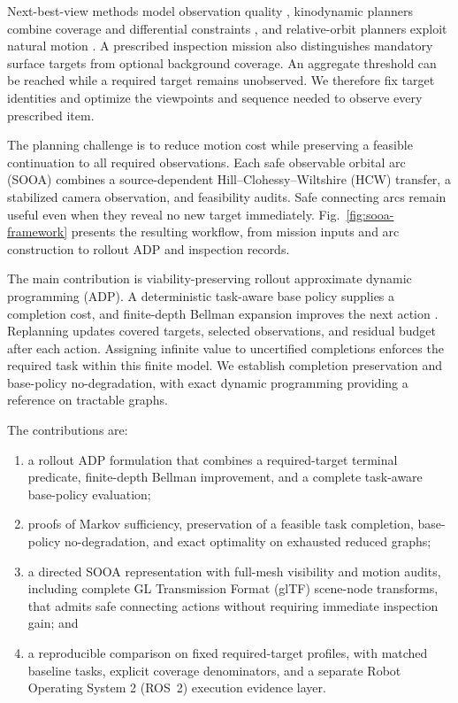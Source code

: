 \documentclass{IEEEtaes}
\theoremstyle{remark}
\theoremstyle{plain}
\begin{document}
Next-best-view methods model observation quality \cite{scott2003view}, kinodynamic planners combine coverage and differential constraints \cite{faghihi2022kinodynamic,faghihi2023multiple}, and relative-orbit planners exploit natural motion \cite{hou2024relative,deka2023astrodynamics}. A prescribed inspection mission also distinguishes mandatory surface targets from optional background coverage. An aggregate threshold can be reached while a required target remains unobserved. We therefore fix target identities and optimize the viewpoints and sequence needed to observe every prescribed item.

The planning challenge is to reduce motion cost while preserving a feasible continuation to all required observations. Each safe observable orbital arc (SOOA) combines a source-dependent Hill--Clohessy--Wiltshire (HCW) transfer, a stabilized camera observation, and feasibility audits. Safe connecting arcs remain useful even when they reveal no new target immediately. Fig.~\ref{fig:sooa-framework} presents the resulting workflow, from mission inputs and arc construction to rollout ADP and inspection records.

The main contribution is viability-preserving rollout approximate dynamic programming (ADP). A deterministic task-aware base policy supplies a completion cost, and finite-depth Bellman expansion improves the next action \cite{bertsekas2020rollout}. Replanning updates covered targets, selected observations, and residual budget after each action. Assigning infinite value to uncertified completions enforces the required task within this finite model. We establish completion preservation and base-policy no-degradation, with exact dynamic programming providing a reference on tractable graphs.

The contributions are:
\begin{enumerate}
  \item a rollout ADP formulation that combines a required-target terminal predicate, finite-depth Bellman improvement, and a complete task-aware base-policy evaluation;
  \item proofs of Markov sufficiency, preservation of a feasible task completion, base-policy no-degradation, and exact optimality on exhausted reduced graphs;
  \item a directed SOOA representation with full-mesh visibility and motion audits, including complete GL Transmission Format (glTF) scene-node transforms, that admits safe connecting actions without requiring immediate inspection gain; and
  \item a reproducible comparison on fixed required-target profiles, with matched baseline tasks, explicit coverage denominators, and a separate Robot Operating System 2 (ROS~2) execution evidence layer.
\end{enumerate}
\end{document}
